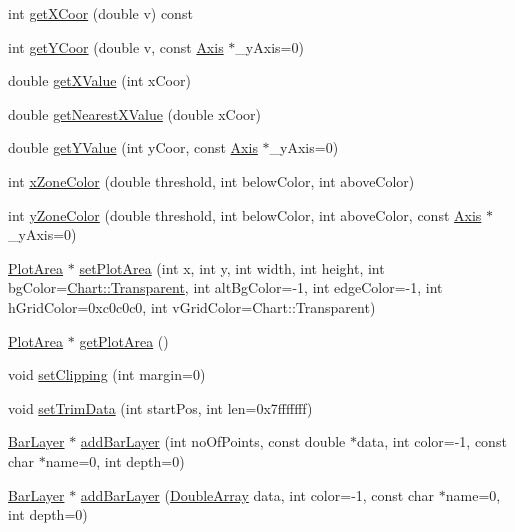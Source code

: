 \begin{DoxyCompactItemize}
int \hyperlink{class_x_y_chart_af5f0a34609220660b81835c11a395286}{get\+X\+Coor} (double v) const
\item 
int \hyperlink{class_x_y_chart_a416792e0d3b2a29fcc5c918948581509}{get\+Y\+Coor} (double v, const \hyperlink{class_axis}{Axis} $\ast$\+\_\+y\+Axis=0)
\item 
double \hyperlink{class_x_y_chart_a09ad6299504a44dcccac5951af31312f}{get\+X\+Value} (int x\+Coor)
\item 
double \hyperlink{class_x_y_chart_aa801760de768b3e3abc5b1ad97f2ce58}{get\+Nearest\+X\+Value} (double x\+Coor)
\item 
double \hyperlink{class_x_y_chart_af777219a26001a954dce11c9ff737aca}{get\+Y\+Value} (int y\+Coor, const \hyperlink{class_axis}{Axis} $\ast$\+\_\+y\+Axis=0)
\item 
int \hyperlink{class_x_y_chart_adb04681a52549d78517588c01556871f}{x\+Zone\+Color} (double threshold, int below\+Color, int above\+Color)
\item 
int \hyperlink{class_x_y_chart_a5501b16635ca95921bf9aa74621a3793}{y\+Zone\+Color} (double threshold, int below\+Color, int above\+Color, const \hyperlink{class_axis}{Axis} $\ast$\+\_\+y\+Axis=0)
\item 
\hyperlink{class_plot_area}{Plot\+Area} $\ast$ \hyperlink{class_x_y_chart_ae33eba813b2503538a2f359ed08d81a5}{set\+Plot\+Area} (int x, int y, int width, int height, int bg\+Color=\hyperlink{namespace_chart_abee0d882fdc9ad0b001245ad9fc64011afc6811800a9e2582dac0157b6279f836}{Chart\+::\+Transparent}, int alt\+Bg\+Color=-\/1, int edge\+Color=-\/1, int h\+Grid\+Color=0xc0c0c0, int v\+Grid\+Color=\+Chart\+::\+Transparent)
\item 
\hyperlink{class_plot_area}{Plot\+Area} $\ast$ \hyperlink{class_x_y_chart_a7159f46e6ac9491d9f373f81b7a4632b}{get\+Plot\+Area} ()
\item 
void \hyperlink{class_x_y_chart_a80c59b10a22fc74334a0e31945b05511}{set\+Clipping} (int margin=0)
\item 
void \hyperlink{class_x_y_chart_a3fed05334f9e4b6e0a9487dadd8cc5dd}{set\+Trim\+Data} (int start\+Pos, int len=0x7fffffff)
\item 
\hyperlink{class_bar_layer}{Bar\+Layer} $\ast$ \hyperlink{class_x_y_chart_afb3bb487fa8f9ea3c2d142cb7fed7eab}{add\+Bar\+Layer} (int no\+Of\+Points, const double $\ast$data, int color=-\/1, const char $\ast$name=0, int depth=0)
\item 
\hyperlink{class_bar_layer}{Bar\+Layer} $\ast$ \hyperlink{class_x_y_chart_ae821562406a385684737ab013a72ffa6}{add\+Bar\+Layer} (\hyperlink{class_double_array}{Double\+Array} data, int color=-\/1, const char $\ast$name=0, int depth=0)

\end{DoxyCompactItemize}
